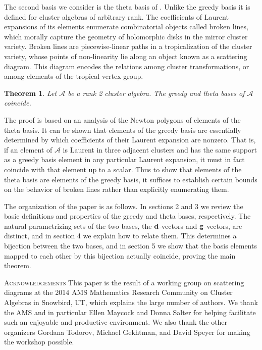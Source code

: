 \documentclass[10pt]{amsart}
\newtheorem{theorem}{Theorem}[section]
\theoremstyle{remark}
\numberwithin{equation}{section}
\newcommand{\bfd}{{\bf d}}
\newcommand{\bfg}{{\bf g}}
\begin{document}
The second basis we consider is the theta basis of \cite{GHKK}.  Unlike the greedy basis it is defined for cluster algebras of arbitrary rank.  The coefficients of Laurent expansions of its elements enumerate combinatorial objects called broken lines, which morally capture the geometry of holomorphic disks in the mirror cluster variety.  Broken lines are piecewise-linear paths in a tropicalization of the cluster variety, whose points of non-linearity lie along an object known as a scattering diagram.  This diagram encodes the relations among cluster transformations, or among elements of the tropical vertex group.

\begin{theorem}
Let $\mathcal{A}$ be a rank 2 cluster algebra.  The greedy and theta bases of $\mathcal{A}$ coincide.
\end{theorem}

The proof is based on an analysis of the Newton polygons of elements of the theta basis.  It can be shown that elements of the greedy basis are essentially determined by which coefficients of their Laurent expansion are nonzero.  That is, if an element of $\mathcal{A}$ is Laurent in three adjacent clusters and has the same support as a greedy basis element in any particular Laurent expansion, it must in fact coincide with that element up to a scalar.  Thus to show that elements of the theta basis are elements of the greedy basis, it suffices to establish certain bounds on the behavior of broken lines rather than explicitly enumerating them.

The organization of the paper is as follows.  In sections 2 and 3 we review the basic definitions and properties of the greedy and theta bases, respectively.  The natural parametrizing sets of the two bases, the $\bfd$-vectors and $\bfg$-vectors, are distinct, and in section 4 we explain how to relate them.  This determines a bijection between the two bases, and in section 5 we show that the basis elements mapped to each other by this bijection actually coincide, proving the main theorem.

\textsc{Acknowledgements} This paper is the result of a working group on scattering diagrams at the 2014 AMS Mathematics Research Community on Cluster Algebras in Snowbird, UT, which explains the large number of authors.  We thank the AMS and in particular Ellen Maycock and Donna Salter for helping facilitate such an enjoyable and productive environment.  We also thank the other organizers Gordana Todorov, Michael Gekhtman, and David Speyer for making the workshop possible.
\end{document}
